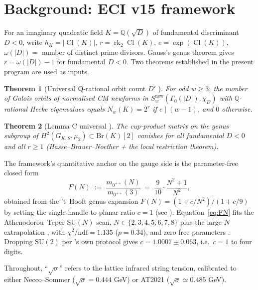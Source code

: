 \documentclass[aps,prl,reprint,superscriptaddress,floatfix,nofootinbib,amssymb]{revtex4-2}
\newtheorem{theorem}{Theorem}
\theoremstyle{definition}
\theoremstyle{remark}
\DeclareMathOperator{\Cl}{Cl}
\DeclareMathOperator{\rk}{rk}
\newcommand{\Q}{\mathbb{Q}}
\begin{document}
\section{Background: ECI v15 framework}\label{sec:background}
For an imaginary quadratic field $K = \Q(\sqrt{D})$ of fundamental
discriminant $D<0$, write $h_K = |\Cl(K)|$, $r = \rk_2 \Cl(K)$, $e =
\exp(\Cl(K))$, $\omega(|D|) = $ number of distinct prime divisors.
Gauss's genus theorem \cite[\S\S225--237]{Gauss1801} gives $r =
\omega(|D|) - 1$ for fundamental $D < 0$. Two theorems established in
the present program are used as inputs.

\begin{theorem}[Universal Q-rational orbit count $D'$ \cite{ECI_v15_2026}]
\label{thm:Dprime}
For odd $w \ge 3$, the number of Galois orbits of normalised CM
newforms in $S_w^{\mathrm{new}}(\Gamma_0(|D|), \chi_D)$ with
$\Q$-rational Hecke eigenvalues equals
$N_w(K) = 2^r$ if $e \mid (w-1)$, and $0$ otherwise.
\end{theorem}

\begin{theorem}[Lemma C universal \cite{ECI_v15_2026}]\label{thm:LemmaC}
The cup-product matrix on the genus subgroup of $H^2(G_{K,S}, \mu_2)
\subset \mathrm{Br}(K)[2]$ vanishes for all fundamental $D<0$ and all
$r \ge 1$ (Hasse--Brauer--Noether \cite{HBN1932} + the local
restriction theorem).
\end{theorem}

The framework's quantitative anchor on the gauge side is the
parameter-free closed form
\begin{equation}\label{eq:FN}
F(N) \;:=\; \frac{m_{0^{++}}(N)}{m_{0^{++}}(3)} \;=\; \frac{9}{10}
\cdot \frac{N^2+1}{N^2},
\end{equation}
obtained from the 't~Hooft genus expansion $F(N) =
(1+c/N^2)/(1+c/9)$ by setting the single-handle-to-planar ratio $c=1$
(see \cite{ECI_v15_2026,tHooft1974}). Equation~\eqref{eq:FN} fits
the Athenodorou--Teper $\mathrm{SU}(N)$ scan, $N\in\{2,3,4,5,6,7,8\}$
plus the large-$N$ extrapolation \cite[Tab.~34, 38]{AthenodorouTeper2021},
with $\chi^2/\mathrm{ndf} = 1.135$ ($p=0.34$), and zero free parameters
\cite{ECI_v15_2026}. Dropping $\mathrm{SU}(2)$ per
\cite[\S5.6]{AthenodorouTeper2021}'s own protocol gives
$c = 1.0007 \pm 0.063$, i.e.\ $c=1$ to four digits.

Throughout, ``$\sqrt{\sigma}$'' refers to the lattice infrared string
tension, calibrated to either Necco--Sommer ($\sqrt{\sigma}=0.444$
GeV) or AT2021 ($\sqrt{\sigma}\simeq 0.485$ GeV).
\end{document}
